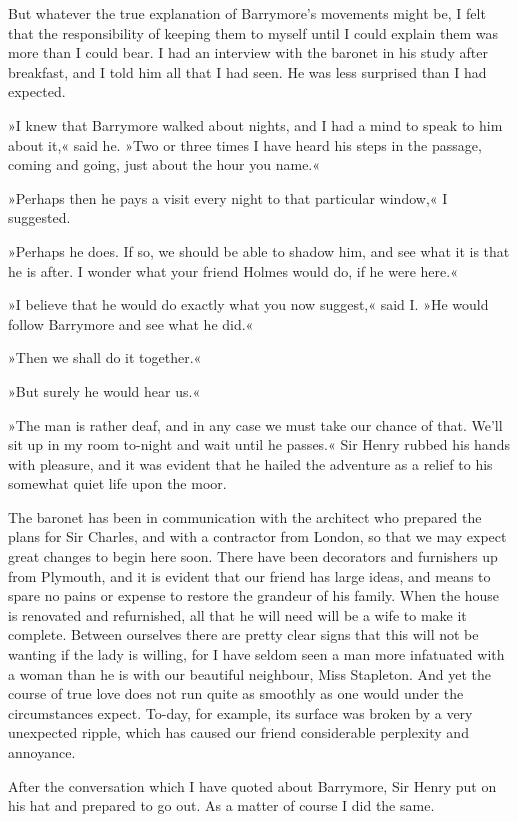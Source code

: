 But whatever the true explanation of Barrymore's movements might be, I felt that the responsibility of keeping them to myself until I could explain them was more than I could bear. I had an interview with the baronet in his study after breakfast, and I told him all that I had seen. He was less surprised than I had expected.

»I knew that Barrymore walked about nights, and I had a mind to speak to him about it,« said he. »Two or three times I have heard his steps in the passage, coming and going, just about the hour you name.«

»Perhaps then he pays a visit every night to that particular window,« I suggested.

»Perhaps he does. If so, we should be able to shadow him, and see what it is that he is after. I wonder what your friend Holmes would do, if he were here.«

»I believe that he would do exactly what you now suggest,« said I. »He would follow Barrymore and see what he did.«

»Then we shall do it together.«

»But surely he would hear us.«

»The man is rather deaf, and in any case we must take our chance of that. We'll sit up in my room to-night and wait until he passes.« Sir Henry rubbed his hands with pleasure, and it was evident that he hailed the adventure as a relief to his somewhat quiet life upon the moor.

The baronet has been in communication with the architect who prepared the plans for Sir Charles, and with a contractor from London, so that we may expect great changes to begin here soon. There have been decorators and furnishers up from Plymouth, and it is evident that our friend has large ideas, and means to spare no pains or expense to restore the grandeur of his family. When the house is renovated and refurnished, all that he will need will be a wife to make it complete. Between ourselves there are pretty clear signs that this will not be wanting if the lady is willing, for I have seldom seen a man more infatuated with a woman than he is with our beautiful neighbour, Miss Stapleton. And yet the course of true love does not run quite as smoothly as one would under the circumstances expect. To-day, for example, its surface was broken by a very unexpected ripple, which has caused our friend considerable perplexity and annoyance.

After the conversation which I have quoted about Barrymore, Sir Henry put on his hat and prepared to go out. As a matter of course I did the same.

